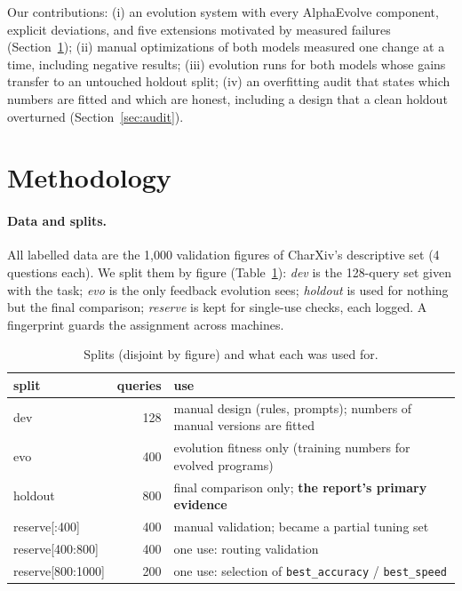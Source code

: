 \documentclass{article}
\begin{document}
Our contributions: (i) an evolution system with every AlphaEvolve component, explicit deviations, and five
extensions motivated by measured failures (Section~\ref{sec:method}); (ii) manual optimizations of both models
measured one change at a time, including negative results; (iii) evolution runs for both models whose gains
transfer to an untouched holdout split; (iv) an overfitting audit that states which numbers are fitted and which
are honest, including a design that a clean holdout overturned (Section~\ref{sec:audit}).

\section{Methodology}
\label{sec:method}

\paragraph{Data and splits.} All labelled data are the 1{,}000 validation figures of CharXiv's descriptive set
(4 questions each). We split them by figure (Table~\ref{tab:splits}): \emph{dev} is the 128-query set given with the
task; \emph{evo} is the only feedback evolution sees; \emph{holdout} is used for nothing but the final comparison;
\emph{reserve} is kept for single-use checks, each logged. A fingerprint guards the assignment across machines.

\begin{table}[h]
\centering\small
\caption{Splits (disjoint by figure) and what each was used for.}
\label{tab:splits}
\begin{tabular}{lrl}
\toprule
split & queries & use \\
\midrule
dev & 128 & manual design (rules, prompts); numbers of manual versions are fitted \\
evo & 400 & evolution fitness only (training numbers for evolved programs) \\
holdout & 800 & final comparison only; \textbf{the report's primary evidence} \\
reserve[:400] & 400 & manual validation; became a partial tuning set \\
reserve[400:800] & 400 & one use: routing validation \\
reserve[800:1000] & 200 & one use: selection of \texttt{best\_accuracy} / \texttt{best\_speed} \\
\bottomrule
\end{tabular}
\end{table}
\end{document}
